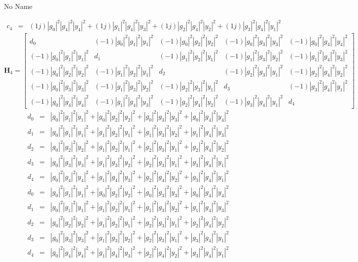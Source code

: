 \documentclass[a4paper,10pt]{article}
\begin{document}
\begin{section}{No Name}
\begin{landscape}
\begin{eqnarray}
c_{4} &=& (1j)|g_0|^2|g_4|^2|y_4|^2 + (1j)|g_1|^2|g_4|^2|y_3|^2 + (1j)|g_2|^2|g_4|^2|y_2|^2 + (1j)|g_3|^2|g_4|^2|y_1|^2
\end{eqnarray}
\begin{equation}
\boldsymbol{H}_4 = 
\begin{bmatrix}
d_{0}&(-1)|g_0|^2|g_1|^2|y_1|^2&(-1)|g_0|^2|g_2|^2|y_2|^2&(-1)|g_0|^2|g_3|^2|y_3|^2&(-1)|g_0|^2|g_4|^2|y_4|^2\\
(-1)|g_0|^2|g_1|^2|y_1|^2&d_{1}&(-1)|g_1|^2|g_2|^2|y_1|^2&(-1)|g_1|^2|g_3|^2|y_2|^2&(-1)|g_1|^2|g_4|^2|y_3|^2\\
(-1)|g_0|^2|g_2|^2|y_2|^2&(-1)|g_1|^2|g_2|^2|y_1|^2&d_{2}&(-1)|g_2|^2|g_3|^2|y_1|^2&(-1)|g_2|^2|g_4|^2|y_2|^2\\
(-1)|g_0|^2|g_3|^2|y_3|^2&(-1)|g_1|^2|g_3|^2|y_2|^2&(-1)|g_2|^2|g_3|^2|y_1|^2&d_{3}&(-1)|g_3|^2|g_4|^2|y_1|^2\\
(-1)|g_0|^2|g_4|^2|y_4|^2&(-1)|g_1|^2|g_4|^2|y_3|^2&(-1)|g_2|^2|g_4|^2|y_2|^2&(-1)|g_3|^2|g_4|^2|y_1|^2&d_{4}
\end{bmatrix}
\end{equation}
\begin{eqnarray}
d_{0} &=& |g_0|^2|g_1|^2|y_1|^2 + |g_0|^2|g_2|^2|y_2|^2 + |g_0|^2|g_3|^2|y_3|^2 + |g_0|^2|g_4|^2|y_4|^2\\
d_{1} &=& |g_0|^2|g_1|^2|y_1|^2 + |g_1|^2|g_2|^2|y_1|^2 + |g_1|^2|g_3|^2|y_2|^2 + |g_1|^2|g_4|^2|y_3|^2\\
d_{2} &=& |g_0|^2|g_2|^2|y_2|^2 + |g_1|^2|g_2|^2|y_1|^2 + |g_2|^2|g_3|^2|y_1|^2 + |g_2|^2|g_4|^2|y_2|^2\\
d_{3} &=& |g_0|^2|g_3|^2|y_3|^2 + |g_1|^2|g_3|^2|y_2|^2 + |g_2|^2|g_3|^2|y_1|^2 + |g_3|^2|g_4|^2|y_1|^2\\
d_{4} &=& |g_0|^2|g_4|^2|y_4|^2 + |g_1|^2|g_4|^2|y_3|^2 + |g_2|^2|g_4|^2|y_2|^2 + |g_3|^2|g_4|^2|y_1|^2
\end{eqnarray}
\begin{eqnarray}
d_{0} &=& |g_0|^2|g_1|^2|y_1|^2 + |g_0|^2|g_2|^2|y_2|^2 + |g_0|^2|g_3|^2|y_3|^2 + |g_0|^2|g_4|^2|y_4|^2\\
d_{1} &=& |g_0|^2|g_1|^2|y_1|^2 + |g_1|^2|g_2|^2|y_1|^2 + |g_1|^2|g_3|^2|y_2|^2 + |g_1|^2|g_4|^2|y_3|^2\\
d_{2} &=& |g_0|^2|g_2|^2|y_2|^2 + |g_1|^2|g_2|^2|y_1|^2 + |g_2|^2|g_3|^2|y_1|^2 + |g_2|^2|g_4|^2|y_2|^2\\
d_{3} &=& |g_0|^2|g_3|^2|y_3|^2 + |g_1|^2|g_3|^2|y_2|^2 + |g_2|^2|g_3|^2|y_1|^2 + |g_3|^2|g_4|^2|y_1|^2\\
d_{4} &=& |g_0|^2|g_4|^2|y_4|^2 + |g_1|^2|g_4|^2|y_3|^2 + |g_2|^2|g_4|^2|y_2|^2 + |g_3|^2|g_4|^2|y_1|^2

\end{eqnarray}
\end{landscape}
\end{section}
\end{document}
